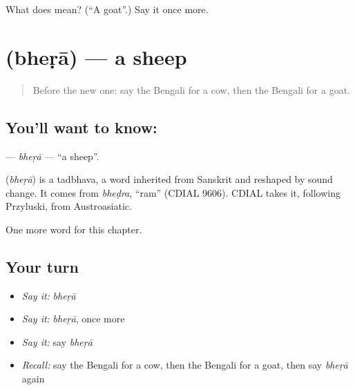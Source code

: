 \begin{tcolorbox}[breakable,colback=teal!4,colframe=teal!35!black,title={Before you move on}]
What does  mean? (\textquotedblleft{}A goat\textquotedblright{}.) Say it once more.
\end{tcolorbox}
\section[\texorpdfstring{\bn{ভেড়া} (bheṛā)}{ভেড়া (bheṛā)}]{ (bheṛā) — a sheep}

\label{lesson:BN-C69-bhera}



\begin{quote}
Before the new one: say the Bengali for a cow, then the Bengali for a goat.
\end{quote}

\subsection*{You'll want to know: }
\textbf{} — \emph{bheṛā} — \textquotedblleft{}a sheep\textquotedblright{}.

\begin{cousinweb}
\textbf{} (\emph{bheṛā}) is a tadbhava, a word inherited from Sanskrit and reshaped by sound change. It comes from \emph{bheḍra}, \textquotedblleft{}ram\textquotedblright{} (CDIAL 9606). CDIAL takes it, following Przyluski, from Austroasiatic.
\end{cousinweb}

\begin{grammarlens}[title={What you've built}]
One more word for this chapter.
\end{grammarlens}

\subsection*{Your turn}
\begin{itemize}
\raggedright
  \item \emph{Say it:} \emph{bheṛā}
  \item \emph{Say it:} \emph{bheṛā}, once more
  \item \emph{Say it:} say \emph{bheṛā}
  \item \emph{Recall:} say the Bengali for a cow, then the Bengali for a goat, then say \emph{bheṛā} again
\end{itemize}

